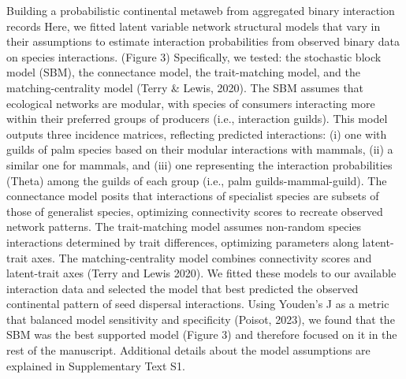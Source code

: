 \documentclass[
]{agujournal2019}
\begin{document}
Building a probabilistic continental metaweb from aggregated binary
interaction records Here, we fitted latent variable network structural
models that vary in their assumptions to estimate interaction
probabilities from observed binary data on species interactions. (Figure
3) Specifically, we tested: the stochastic block model (SBM), the
connectance model, the trait-matching model, and the matching-centrality
model (Terry \& Lewis, 2020). The SBM assumes that ecological networks
are modular, with species of consumers interacting more within their
preferred groups of producers (i.e., interaction guilds). This model
outputs three incidence matrices, reflecting predicted interactions: (i)
one with guilds of palm species based on their modular interactions with
mammals, (ii) a similar one for mammals, and (iii) one representing the
interaction probabilities (Theta) among the guilds of each group (i.e.,
palm guilds-mammal-guild). The connectance model posits that
interactions of specialist species are subsets of those of generalist
species, optimizing connectivity scores to recreate observed network
patterns. The trait-matching model assumes non-random species
interactions determined by trait differences, optimizing parameters
along latent-trait axes. The matching-centrality model combines
connectivity scores and latent-trait axes (Terry and Lewis 2020). We
fitted these models to our available interaction data and selected the
model that best predicted the observed continental pattern of seed
dispersal interactions. Using Youden's J as a metric that balanced model
sensitivity and specificity (Poisot, 2023), we found that the SBM was
the best supported model (Figure 3) and therefore focused on it in the
rest of the manuscript. Additional details about the model assumptions
are explained in Supplementary Text S1.
\end{document}
